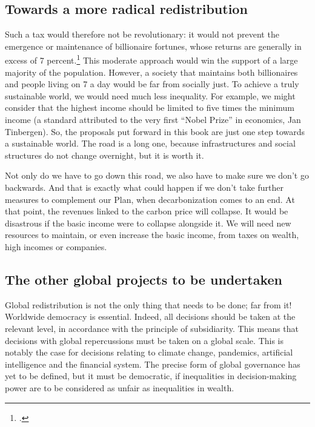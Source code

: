 \documentclass[a5paper,english,openany]{memoir}
\begin{document}
\subsection*{Towards a more radical redistribution}
Such a tax would therefore not be revolutionary: it would not prevent the emergence or maintenance of billionaire fortunes, whose returns are generally in excess of 7 percent.\footnote{\cite{chancel_world_2022}.}  
This moderate approach would win the support of a large majority of the population. However, a society that maintains both billionaires and people living on \textit{\texteuro{}}7 a day would be far from socially just. To achieve a truly sustainable world, we would need much less inequality. %
For example, we might consider that the highest income should be limited to five times the minimum income (a standard attributed to the very first ``Nobel Prize'' in economics, Jan Tinbergen). So, the proposals put forward in this book are just one step towards a sustainable world. The road is a long one, %
because infrastructures and social structures do not change overnight, %
but it is worth it.  

Not only do we have to go down this road, we also have to make sure we don't go backwards. And that is exactly %
what could happen if we don't take further measures to complement our Plan, when decarbonization comes to an end. %
At that point, the revenues linked to the carbon price will collapse. It would be disastrous if the basic income were to collapse alongside it. %
We will need new resources %
to maintain, or even increase  %
the basic income, 
from taxes on wealth, high incomes or companies. 

\subsection*{The other global projects to be undertaken}
Global redistribution is not the only thing that needs to be done; far from it! %
Worldwide %
democracy is essential. %
Indeed, all decisions should be taken at the relevant level, in accordance with the principle of subsidiarity. This means that decisions with global repercussions must be taken on a global scale. %
This is notably the case for decisions relating to climate change, pandemics, artificial intelligence and the financial system. %
The precise form of global governance has yet to be defined, but it must be democratic, if inequalities in decision-making power are to be considered as unfair as inequalities in wealth. %
\end{document}
